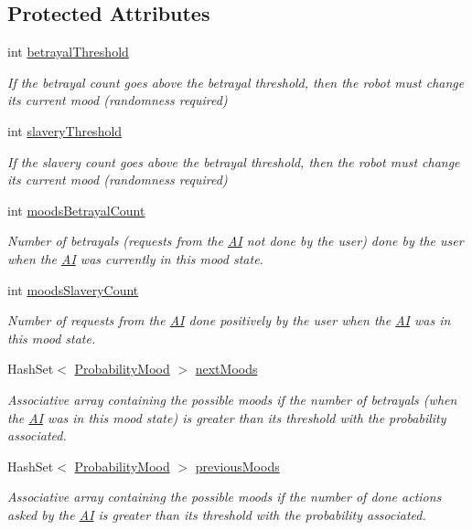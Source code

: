 \subsection*{Protected Attributes}
\begin{DoxyCompactItemize}
\item 
int \hyperlink{a00015_af8ba28f8a5e568f223c07e0acb788be9}{betrayal\-Threshold}
\begin{DoxyCompactList}\small\item\em If the betrayal count goes above the betrayal threshold, then the robot must change its current mood (randomness required) \end{DoxyCompactList}\item 
int \hyperlink{a00015_a12c9abed7c077f9013956cda08e41619}{slavery\-Threshold}
\begin{DoxyCompactList}\small\item\em If the slavery count goes above the betrayal threshold, then the robot must change its current mood (randomness required) \end{DoxyCompactList}\item 
int \hyperlink{a00015_ae300727f17efc1d32e7cc1731f9935fa}{moods\-Betrayal\-Count}
\begin{DoxyCompactList}\small\item\em Number of betrayals (requests from the \hyperlink{a00001}{A\-I} not done by the user) done by the user when the \hyperlink{a00001}{A\-I} was currently in this mood state. \end{DoxyCompactList}\item 
int \hyperlink{a00015_a0bfc4bebdf6767b8c32e747ec21da39e}{moods\-Slavery\-Count}
\begin{DoxyCompactList}\small\item\em Number of requests from the \hyperlink{a00001}{A\-I} done positively by the user when the \hyperlink{a00001}{A\-I} was in this mood state. \end{DoxyCompactList}\item 
Hash\-Set$<$ \hyperlink{a00021}{Probability\-Mood} $>$ \hyperlink{a00015_af19cdc9b24293b9d7898d66720b8e0e7}{next\-Moods}
\begin{DoxyCompactList}\small\item\em Associative array containing the possible moods if the number of betrayals (when the \hyperlink{a00001}{A\-I} was in this mood state) is greater than its threshold with the probability associated. \end{DoxyCompactList}\item 
Hash\-Set$<$ \hyperlink{a00021}{Probability\-Mood} $>$ \hyperlink{a00015_a5c8758b18bb740a2fd1edf8d57a5ab27}{previous\-Moods}
\begin{DoxyCompactList}\small\item\em Associative array containing the possible moods if the number of done actions asked by the \hyperlink{a00001}{A\-I} is greater than its threshold with the probability associated. \end{DoxyCompactList}\end{DoxyCompactItemize}


